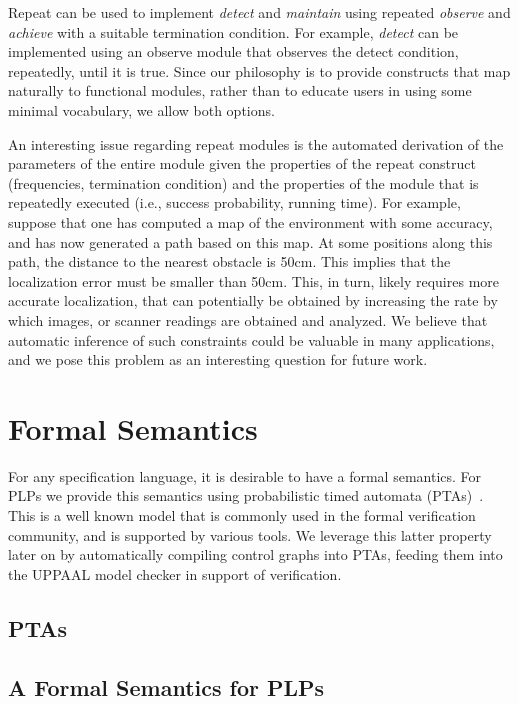 \documentclass[ 5p, 12pt, times, twocolumn, sort&compress ]{elsarticle}
\newcommand\note[1]{\todo[inline, color=red!40]{#1}}
\begin{document}
Repeat can be used to implement {\em detect\/}
and {\em maintain\/} using repeated {\em observe\/} 
and {\em achieve} with a suitable termination condition. For example, {\em detect\/} can be implemented using an observe module that observes the detect condition, repeatedly, until it is true.
Since our philosophy is to provide constructs that
map naturally to functional modules, rather than to educate users in using some minimal vocabulary, we allow both options.

An interesting issue regarding repeat modules is the automated derivation of the parameters of the entire module given the properties of the repeat construct (frequencies, termination condition) and the properties of the module that is repeatedly executed (i.e., success probability, running time). For example, suppose that one has computed a map of the environment with some accuracy, and has now generated a path based on this map. At some positions along this
path, the distance to the nearest obstacle is 50cm. This implies that the localization error must be smaller than 50cm.
This, in turn, likely requires more accurate localization, that can potentially be obtained by increasing the rate by which images, or scanner readings are obtained and analyzed. We believe that automatic inference of such constraints could
be valuable in many applications, and we pose this problem as an interesting question for future work.

\section{Formal Semantics}
For any specification language, it is desirable to have a formal semantics.
For PLPs we provide this semantics using probabilistic timed automata (PTAs)~\cite{}. This is a well known model that is commonly used in the formal verification community, and is supported by various tools. We leverage this latter property later on by automatically compiling control graphs into PTAs, feeding them into the UPPAAL model checker in support of verification. 

\subsection{PTAs}

\subsection{A Formal Semantics for PLPs}
\end{document}
